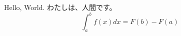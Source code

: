 \documentclass{jsarticle}
\begin{document}
Hello, World.
わたしは、人間です。
\begin{equation}
\int_{a}^{b} f(x)dx=F(b) -F(a)
\end{equation}
\end{document}
